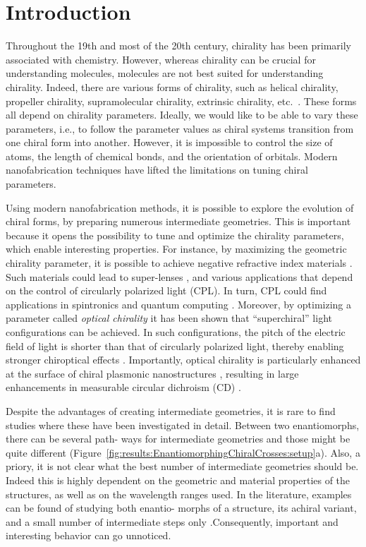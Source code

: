 \section{Introduction}\label{sec:results:EnantiomorphingChiralCrosses:introduction}
Throughout the 19th and most of the 20th century, chirality has been primarily associated with chemistry. However, whereas chirality can be crucial for understanding molecules, molecules are not best suited for understanding chirality. Indeed, there are various forms of chirality, such as helical chirality, propeller chirality, supramolecular chirality, extrinsic chirality, etc.~\cite{Collins2017, Valev2013b}. These forms all depend on chirality parameters. 
Ideally, we would like to be able to vary these parameters, i.e., to follow the parameter values as chiral systems transition from one chiral form into another. However, it is impossible to control the size of atoms, the length of chemical bonds, and the orientation of orbitals. Modern nanofabrication techniques have lifted the limitations on tuning chiral parameters.

Using modern nanofabrication methods, it is possible to explore the evolution of chiral forms, by preparing numerous intermediate geometries. This is important because it opens the possibility to tune and optimize the chirality parameters, which enable interesting properties. For instance, by maximizing the geometric chirality parameter, it is possible to achieve negative refractive index materials \cite{Pendry2004a}. Such materials could lead to super-lenses \cite{Khorasaninejad2016}, and various applications that depend on the control of circularly polarized light (CPL). In turn, CPL could find applications in spintronics \cite{Farshchi2011b} and quantum computing \cite{Wagenknecht2010a, Sherson2006a}.
Moreover, by optimizing a parameter called \textit{optical chirality} \cite{Tang2010} it has been shown that ``superchiral'' light configurations can be achieved. In such configurations, the pitch of the electric field of light is shorter than that of circularly polarized light, thereby enabling stronger chiroptical effects \cite{Hendry2010, Hendry2012, Tullius2015}. Importantly, optical chirality is particularly enhanced at the surface of chiral plasmonic nanostructures \cite{Schaferling2012, Karimullah2015}, resulting in large enhancements in measurable circular dichroism (CD) \cite{Maoz2013, Wang2014c, Ma2013b, Zhang2013}.

Despite the advantages of creating intermediate geometries, it is rare to find studies where these have been investigated in detail. Between two enantiomorphs, there can be several path- ways for intermediate geometries and those might be quite different (Figure~\ref{fig:results:EnantiomorphingChiralCrosses:setup}a). 
Also, a priory, it is not clear what the best number of intermediate geometries should be. Indeed this is highly dependent on the geometric and material properties of the structures, as well as on the wavelength ranges used. In the literature, examples can be found of studying both enantio- morphs of a structure, its achiral variant, and a small number of intermediate steps only \cite{Zu2016}.Consequently, important and interesting behavior can go unnoticed.

